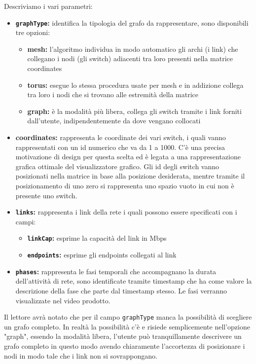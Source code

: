 \documentclass[binding=0.6cm]{sapthesis}
\begin{document}
Descriviamo i vari parametri:
\begin{itemize}
    \item \textbf{\texttt{graphType}:} identifica la tipologia del grafo da rappresentare, sono disponibili tre opzioni:
    \begin{itemize}
        \item \textbf{mesh:} l'algoritmo individua in modo automatico gli archi (i link) che collegano i nodi (gli switch) adiacenti tra loro presenti 
        nella matrice coordinates
        \item \textbf{torus:} esegue lo stessa procedura usate per mesh e in addizione collega tra loro i nodi che si trovano alle estremità della matrice
        \item \textbf{graph:} è la modalità più libera, collega gli switch tramite i link forniti dall'utente, indipendentemente da dove vengano collocati
    \end{itemize}
    \item \textbf{coordinates:} rappresenta le coordinate dei vari switch, 
    i quali vanno rappresentati con un id numerico che va da 1 a 1000. 
    C'è una precisa motivazione di design per questa scelta ed è legata a una rappresentazione 
    grafica ottimale del visualizzatore grafico.
    Gli id degli switch vanno posizionati nella matrice in base alla posizione desiderata, mentre tramite il posizionamento di uno zero si rappresenta uno spazio vuoto in cui non è presente uno switch.
    \item \textbf{\texttt{links}:} rappresenta i link della rete i quali possono essere specificati con i campi:
    \begin{itemize}
        \item \textbf{\texttt{linkCap}:} esprime la capacità del link in Mbps
        \item \textbf{\texttt{endpoints}:} esprime gli endpoints collegati al link
    \end{itemize}
    \item \textbf{\texttt{phases}:} rappresenta le fasi temporali che accompagnano la durata dell'attività di rete, sono identificate tramite timestamp che ha come valore la descrizione della fase che parte dal timestamp stesso. Le fasi verranno visualizzate nel video prodotto.
\end{itemize}
Il lettore avrà notato che per il campo \texttt{graphType} manca la possibilità di scegliere un grafo completo. In realtà la possibilità c'è e risiede semplicemente
nell'opzione "graph", essendo la modalità libera, l'utente può tranquillamente descrivere un grafo completo in questo modo avendo chiaramente l'accortezza di posizionare i nodi in modo tale che i link non si sovrappongano.
\end{document}
